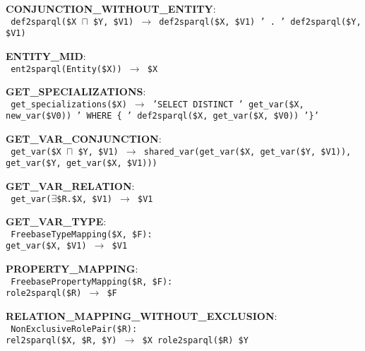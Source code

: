 \documentclass[letterpaper]{article}
\begin{document}
\small{
\begin{flushleft}
\begin{flushleft}
\noindent \textbf{CONJUNCTION\_WITHOUT\_ENTITY}: \\
\texttt{
def2sparql(\$X $\sqcap$ \$Y, \$V1) $\rightarrow$ def2sparql(\$X, \$V1) ' . ' def2sparql(\$Y, \$V1)
}
\end{flushleft}
\begin{flushleft}
\noindent \textbf{ENTITY\_MID}: \\
\texttt{
ent2sparql(Entity(\$X)) $\rightarrow$ \$X
}
\end{flushleft}
\begin{flushleft}
\noindent \textbf{GET\_SPECIALIZATIONS}: \\
\texttt{
get\_specializations(\$X) $\rightarrow$ 'SELECT DISTINCT ' get\_var(\$X, new\_var(\$V0)) ' WHERE \{ ' def2sparql(\$X, get\_var(\$X, \$V0)) '\}'
}
\end{flushleft}
\begin{flushleft}
\noindent \textbf{GET\_VAR\_CONJUNCTION}: \\
\texttt{
get\_var(\$X $\sqcap$ \$Y, \$V1) $\rightarrow$ shared\_var(get\_var(\$X, get\_var(\$Y, \$V1)), get\_var(\$Y, get\_var(\$X, \$V1)))
}
\end{flushleft}
\begin{flushleft}
\noindent \textbf{GET\_VAR\_RELATION}: \\
\texttt{
get\_var($\exists$\$R.\$X, \$V1) $\rightarrow$ \$V1
}
\end{flushleft}
\begin{flushleft}
\noindent \textbf{GET\_VAR\_TYPE}: \\
\texttt{
FreebaseTypeMapping(\$X, \$F):  \\
get\_var(\$X, \$V1) $\rightarrow$ \$V1
}
\end{flushleft}
\begin{flushleft}
\noindent \textbf{PROPERTY\_MAPPING}: \\
\texttt{
FreebasePropertyMapping(\$R, \$F):  \\
role2sparql(\$R) $\rightarrow$ \$F
}
\end{flushleft}
\begin{flushleft}
\noindent \textbf{RELATION\_MAPPING\_WITHOUT\_EXCLUSION}: \\
\texttt{
NonExclusiveRolePair(\$R):  \\
rel2sparql(\$X, \$R, \$Y) $\rightarrow$ \$X role2sparql(\$R) \$Y
}
\end{flushleft}
\begin{flushleft}

\end{flushleft}
\end{flushleft}}
\end{document}
